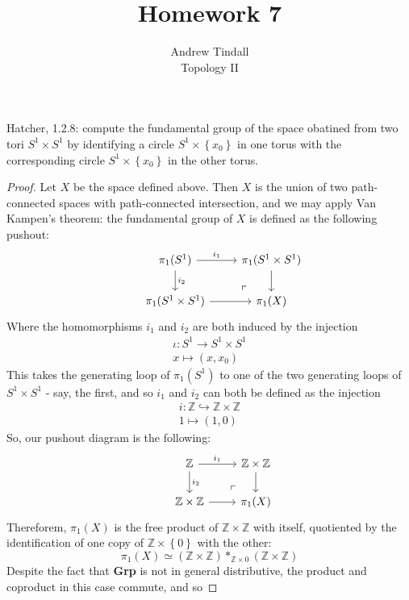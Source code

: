 \documentclass[12pt]{article}
\newcommand{\Z}{\mathbb{Z}}
\theoremstyle{definition}
\newenvironment{problem}[2][Problem]{\begin{trivlist}
\item[\hskip \labelsep {\bfseries #1}\hskip \labelsep {\bfseries #2.}]}{\end{trivlist}}
\begin{document}
 
 
\title{Homework 7}
\author{Andrew Tindall\\ Topology II}
\maketitle
\begin{problem}{1}
	Hatcher, 1.2.8: compute the fundamental group of the space obatined from two tori $S^1 \times S^1$ by identifying a circle $S^1\times \left\{ x_0 \right\}$ in one torus with the corresponding circle $S^1 \times \left\{ x_0 \right\}$ in the other torus.
	\begin{proof}
		Let $X$ be the space defined above. Then $X$ is the union of two path-connected spaces with path-connected intersection, and we may apply Van Kampen's theorem: the fundamental group of $X$ is defined as the following pushout:
\[\begin{tikzcd}& \pi_1(S^1) 
\arrow[r, "i_1"] \arrow[d, "i_2"] & \pi_1(S^1 \times S^1) \arrow[d ]\\& \pi_1(S^1 \times S^1) \arrow[r] & \pi_1(X) \arrow[ul, phantom, "\ulcorner", very near start]\end{tikzcd}\] 
Where the homomorphisms $i_1$ and $i_2$ are both induced by the injection
\begin{align*}\iota: S^1 \to S^1\times S^1\\
x \mapsto (x, x_0)\end{align*}
This takes the generating loop of $\pi_1(S^1)$ to one of the two generating loops of $S^1 \times S^1$ - say, the first, and so $i_1$ and $i_2$ can both be defined as the injection 
\begin{align*}i: \Z \hookrightarrow \Z \times \Z\\
	1 \mapsto (1, 0)
\end{align*}
So, our pushout diagram is the following:
\[\begin{tikzcd}& \Z
\arrow[r, "i_1"] \arrow[d, "i_2"] & \Z \times \Z  \arrow[d ]\\& \Z \times \Z \arrow[r] & \pi_1(X) \arrow[ul, phantom, "\ulcorner", very near start]\end{tikzcd}\]
Thereforem, $\pi_1(X)$ is the free product of $\Z \times \Z$ with itself, quotiented by the identification of one copy of $\Z \times \left\{ 0 \right\}$ with the other:
\[\pi_1(X) \simeq (\Z \times \Z) *_{\Z \times 0} (\Z \times \Z)\]
Despite the fact that \textbf{Grp} is not in general distributive, the product and coproduct in this case commute, and so 

\end{proof}
\end{problem}
\end{document}

